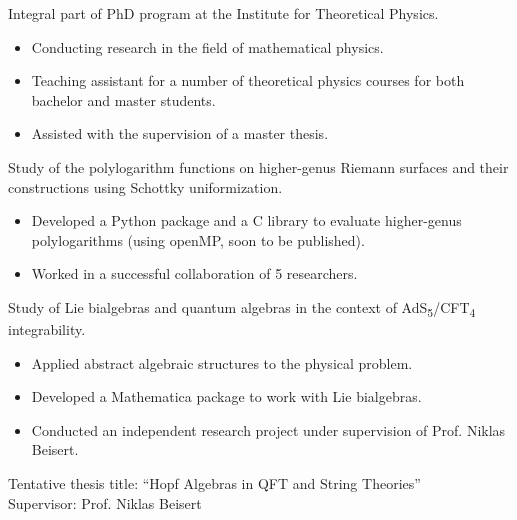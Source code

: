 \documentclass[10pt,a4paper,ragged2e,withhyper]{altacv}
\begin{document}
\begin{paracol}{2}

Integral part of PhD program at the Institute for Theoretical Physics.
\begin{itemize}
  \item Conducting research in the field of mathematical physics.
  \item Teaching assistant for a number of theoretical physics courses for both bachelor and master students.
  \item Assisted with the supervision of a master thesis.
\end{itemize}


\vspace{-0.25em}
Study of the polylogarithm functions on higher-genus Riemann surfaces and their 
constructions using Schottky uniformization.
\begin{itemize}
  \item Developed a Python package and a C library to evaluate higher-genus polylogarithms (using openMP, soon to be published).
  \item Worked in a successful collaboration of 5 researchers.
\end{itemize}

\medskip

\vspace{-0.25em}
Study of Lie bialgebras and quantum algebras in the context of AdS\textsubscript{5}/CFT\textsubscript{4} integrability.
\begin{itemize}
\item Applied abstract algebraic structures to the physical problem.
\item Developed a Mathematica package to work with Lie bialgebras.
\item Conducted an independent research project under supervision of Prof. Niklas Beisert.
\end{itemize}


{\color{ETHBlue80}Tentative thesis title:} ``Hopf Algebras in QFT and String Theories''\\
{\color{ETHBlue80}Supervisor:} Prof. Niklas Beisert


\end{paracol}
\end{document}

